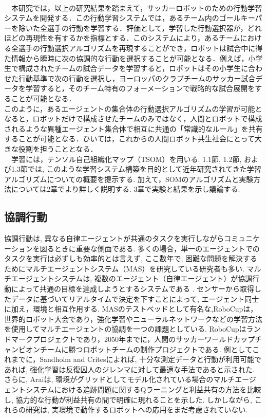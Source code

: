 \\　本研究では，以上の研究結果を踏まえて，サッカーロボットのための行動学習システムを開発する．この行動学習システムでは，あるチーム内のゴールキーパーを除いた全選手の行動を学習する．評価として，学習した行動選択器が，どれほどの再現性を有するかを指標とする．このシステムにより，あるチームにおける全選手の行動選択アルゴリズムを再現することができ，ロボットは試合中に得た情報から瞬時に次の協調的な行動を選択することが可能となる．例えば，小学生で構成されたチームの試合データを学習すると，ロボットはその小学生に合わせた行動基準で次の行動を選択し，ヨーロッパのクラブチームのサッカー試合データを学習すると，そのチーム特有のフォーメーションで戦略的な試合展開をすることが可能となる．
\\ このように，あるエージェントの集合体の行動選択アルゴリズムの学習が可能となると，ロボットだけで構成させたチームのみではなく，人間とロボットで構成されるような異種エージェント集合体で相互に共通の「常識的なルール」を共有することが可能となる．ひいては，これからの人間ロボット共生社会にとって大きな役割を担うこととなる．
\\　学習には，テンソル自己組織化マップ（TSOM）\cite{Kohonen}を用いる. 1.1節, 1.2節, および1.3節では, このような学習システム構築を目的として近年研究されてきた学習アルゴリズムについての概要を提示する. 加えて，SOMのアルゴリズムと実験方法については2章でより詳しく説明する. 3章で実験と結果を示し議論する. 
\subsection{協調行動}%
協調行動は, 異なる自律エージェントが共通のタスクを実行しながらコミュニケーションを図るときに重要な側面である. 多くの場合，単一のエージェントでのタスクを実行は必ずしも効率的とは言えず, ここ数年で, 困難な問題を解決するためにマルチエージェントシステム（MAS）を研究している研究者も多い. マルチエージェントシステムは, 複数のエージェント（自律エージェント）が協調行動によって共通の目標を達成しようとするシステムである .  センサーから取得したデータに基づいてリアルタイムで決定を下すことによって, エージェント同士に加え，環境と相互作用する. \cite{PS}\cite{KU}
MASのテストベッドとして有名な,RoboCupは，世界的ロボット大会であり，強化学習やニューラルネットワークなどの学習方法を使用してマルチエージェントの協調を一つの課題としている.  RoboCupはランドマークプロジェクトであり，2050年までに，人間のサッカーワールドカップチャンピオンチームに勝つロボットチームの制作プロジェクトである\cite{BS}. 
例としてこれまでに，Sandholm and Crites\cite{TWS}によれば, 十分な測定データと行動が利用可能であれば, 強化学習は反復囚人のジレンマに対して最適な手法であると示された. さらに, Arai\cite{SA}は, 環境がグリッドとしてモデル化されている場合のマルチエージェントシステムにおける追跡問題に関するQラーニングと利益共有の方法を比較し, 協力的な行動が利益共有の間で明確に現れることを示した. しかしながら, これらの研究は, 実環境で動作するロボットへの応用をまだ考慮されていない. 
